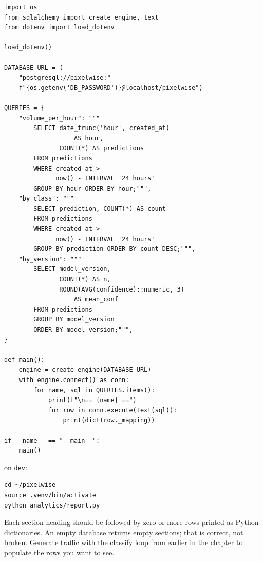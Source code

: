 \begin{verbatim}
import os
from sqlalchemy import create_engine, text
from dotenv import load_dotenv

load_dotenv()

DATABASE_URL = (
    "postgresql://pixelwise:"
    f"{os.getenv('DB_PASSWORD')}@localhost/pixelwise")

QUERIES = {
    "volume_per_hour": """
        SELECT date_trunc('hour', created_at)
                   AS hour,
               COUNT(*) AS predictions
        FROM predictions
        WHERE created_at >
              now() - INTERVAL '24 hours'
        GROUP BY hour ORDER BY hour;""",
    "by_class": """
        SELECT prediction, COUNT(*) AS count
        FROM predictions
        WHERE created_at >
              now() - INTERVAL '24 hours'
        GROUP BY prediction ORDER BY count DESC;""",
    "by_version": """
        SELECT model_version,
               COUNT(*) AS n,
               ROUND(AVG(confidence)::numeric, 3)
                   AS mean_conf
        FROM predictions
        GROUP BY model_version
        ORDER BY model_version;""",
}

def main():
    engine = create_engine(DATABASE_URL)
    with engine.connect() as conn:
        for name, sql in QUERIES.items():
            print(f"\n== {name} ==")
            for row in conn.execute(text(sql)):
                print(dict(row._mapping))

if __name__ == "__main__":
    main()
\end{verbatim}


 on \texttt{dev}:

\begin{verbatim}
cd ~/pixelwise
source .venv/bin/activate
python analytics/report.py
\end{verbatim}

Each section heading should be followed by zero or more rows printed as
Python dictionaries. An empty database returns empty sections; that is
correct, not broken. Generate traffic with the classify loop from
earlier in the chapter to populate the rows you want to see.

